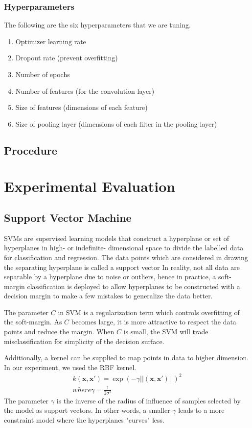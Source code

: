\documentclass[letterpaper]{article}
\begin{document}
\subsubsection{Hyperparameters}
The following are the six hyperparameters that we are tuning.
\begin{enumerate}
    \item Optimizer learning rate
    \item Dropout rate (prevent overfitting)
    \item Number of epochs
    \item Number of features (for the convolution layer)
    \item Size of features (dimensions of each feature)
    \item Size of pooling layer (dimensions of each filter in the pooling layer)
\end{enumerate}

\subsection{Procedure}

\section{Experimental Evaluation}

\subsection{Support Vector Machine}
SVMs are supervised learning models that construct a hyperplane or set of hyperplanes in high-
or indefinite- dimensional space to divide the labelled data for classification and regression.
The data points which are considered in drawing the separating hyperplane is called a support
vector In reality, not all data are separable by a hyperplane due to noise or outliers, hence in
practice, a soft-margin classification is deployed to allow hyperplanes to be constructed
with a decision margin to make a few mistakes to generalize the data better.

The parameter $\textit{C}$ in SVM is a regularization term which controls overfitting of the soft-margin.
As $\textit{C}$ becomes large, it is more attractive to respect the data points and reduce
the margin. When $\textit{C}$ is small, the SVM will trade misclassification for simplicity
of the decision surface.

Additionally, a kernel can be supplied to map points in data to higher dimension. In our
experiment, we used the RBF kernel.
\begin{align*}
  k (\textbf{x},\textbf{x}') = \exp(-\gamma||(\textbf{x},\textbf{x}')||)^2 \\
  where \gamma = \frac{1}{2\sigma^2}
\end{align*}
The parameter $\gamma$ is the inverse of the radius of influence of samples selected by the
model as support vectors. In other words, a smaller $\gamma$ leads to a more constraint
model where the hyperplanes "curves" less.
\end{document}
